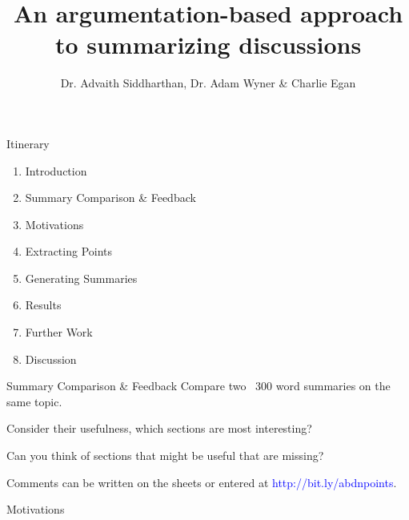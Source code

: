 \documentclass{beamer}
\title{An argumentation-based approach to summarizing discussions}
\date{}
\author{Dr. Advaith Siddharthan, Dr. Adam Wyner \& Charlie Egan}
\institute{University of Aberdeen}
\begin{document}
  \maketitle
  \begin{frame}{Itinerary}
    \begin{enumerate}
      \item{Introduction}
      \item{Summary Comparison \& Feedback}
      \item{Motivations}
      \item{Extracting Points}
      \item{Generating Summaries}
      \item{Results}
      \item{Further Work}
      \item{Discussion}
	\end{enumerate}
  \end{frame}

  \begin{frame}{Summary Comparison \& Feedback}
	Compare two ~300 word summaries on the same topic.

	\vfill

	Consider their usefulness, which sections are most interesting?

	Can you think of sections that might be useful that are missing?

	\vfill

    Comments can be written on the sheets or entered at \textcolor{blue}{http://bit.ly/abdnpoints}.
  \end{frame}

  \begin{frame}{Motivations}
	\begin{center}


	\end{center}
  \end{frame}
\end{document}
